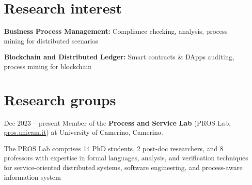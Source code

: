 \section{Research interest}
    
    \textbf{Business Process Management:} Compliance checking, analysis, process mining for distributed scenarios

    \abitspace
        
    \textbf{Blockchain and Distributed Ledger:} Smart contracts \& DApps auditing, process mining for blockchain

\section{Research groups}

    \begin{twocolentry}{Dec 2023 – present}
    Member of the \textbf{Process and Service Lab} (PROS Lab,
\href{https://pros.unicam.it}{pros.unicam.it}) at University of Camerino, Camerino.
    \end{twocolentry}
    The PROS Lab comprises 14 PhD students, 2 post-doc researchers, and 8 professors with expertise in formal languages, analysis, and verification techniques for service-oriented distributed systems, software engineering, and process-aware information system